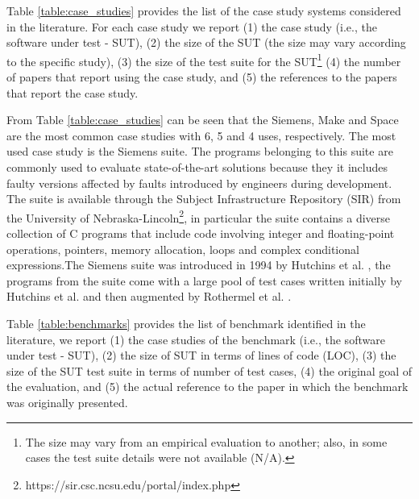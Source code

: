 

Table \ref{table:case_studies} provides the list of the case study systems considered in the literature. For each case study we report (1) the case study (i.e., the software under test - SUT), (2) the size of the SUT (the size may vary according to the specific study), (3) the size of the test suite for the SUT\footnote{The size may vary from an empirical evaluation to another; also, in some cases the test suite details were not available (N/A).} (4) the number of papers that report using the case study, and (5) the references to the papers that report the case study.


From Table \ref{table:case_studies} can be seen that the Siemens, Make and Space are the most common case studies with 6, 5 and 4 uses, respectively. 
The most used case study is the Siemens suite. The programs belonging to this suite are commonly used to evaluate state-of-the-art solutions because they it includes faulty versions affected by faults introduced by engineers during development. The suite is available through the Subject Infrastructure Repository (SIR) from the University of Nebraska-Lincoln\footnote{https://sir.csc.ncsu.edu/portal/index.php}, in particular the suite contains a diverse collection of C programs that include code involving integer and floating-point operations, pointers, memory allocation, loops and complex conditional expressions.The Siemens suite was introduced in 1994 by Hutchins et al. \cite{hutchins1994experiments}, the programs from the suite come with a large pool of test cases written initially by Hutchins et al. and then augmented by Rothermel et al. \cite{rothermel1998empirical}.

Table \ref{table:benchmarks} provides the list of benchmark identified in the literature, we report (1) the case studies of the benchmark (i.e., the software under test - SUT), (2) the size of SUT in terms of lines of code (LOC), (3) the size of the SUT test suite in terms of number of test cases, (4) the original goal of the evaluation, and (5) the actual reference to the paper in which the benchmark was originally presented. 




